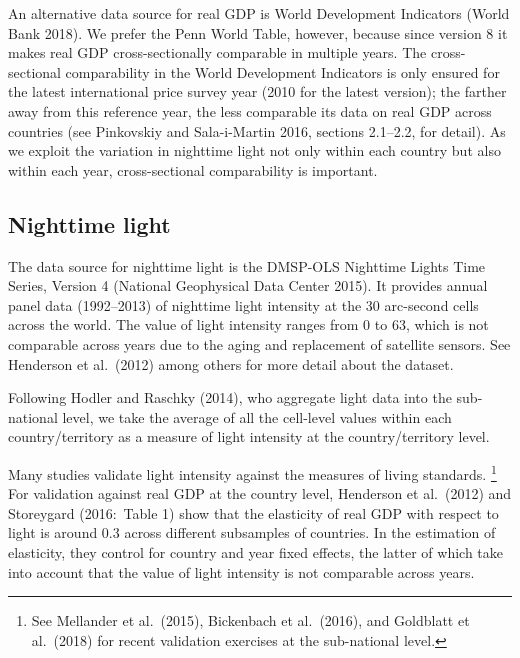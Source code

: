 \documentclass[12pt,a4paper]{article}%
\begin{document}
An alternative data source for real GDP is World Development Indicators (World Bank 2018). 
We prefer the Penn World Table, however, because since version 8 it makes real GDP cross-sectionally comparable in multiple years. 
The cross-sectional comparability in the World Development Indicators is only ensured for the latest international price survey year (2010 for the latest version); the farther away from this reference year, the less comparable its data on real GDP across countries (see Pinkovskiy and Sala-i-Martin 2016, sections 2.1--2.2, for detail).
As we exploit the variation in nighttime light not only within each country but also within each year, cross-sectional comparability is important.

\subsection{Nighttime light}
The data source for nighttime light is the DMSP-OLS Nighttime Lights Time Series, Version 4 (National Geophysical Data Center 2015). 
It provides annual panel data (1992--2013) of nighttime light intensity at the 30 arc-second cells across the world. 
The value of light intensity ranges from 0 to 63, which is not comparable across years due to the aging and replacement of satellite sensors. 
See Henderson et al.\ (2012) among others for more detail about the dataset.

Following Hodler and Raschky (2014), who aggregate light data into the sub-national level, we take the average of all the cell-level values within each country/territory as a measure of light intensity at the country/territory level.

Many studies validate light intensity against the measures of living standards.%
\footnote{See Mellander et al.\ (2015), Bickenbach et al.\ (2016), and Goldblatt et al.\ (2018) for recent validation exercises at the sub-national level.} 
For validation against real GDP at the country level, Henderson et al.\ (2012) and Storeygard (2016:\ Table 1) show that the elasticity of real GDP with respect to light is around 0.3 across different subsamples of countries. 
In the estimation of elasticity, they control for country and year fixed effects, the latter of which take into account that the value of light intensity is not comparable across years.
\end{document}
